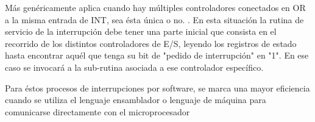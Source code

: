 \documentclass[12pt, letter]{article}
\begin{document}
\setlength{\parindent}{31pt}
Más genéricamente aplica cuando hay múltiples controladores conectados en OR a la misma entrada de INT, sea ésta única o no. \parencite{ArquitecturaCom}. En esta situación la rutina de servicio de la interrupción debe tener una parte inicial que consista en el recorrido de los distintos controladores de E/S, leyendo los registros de estado hasta encontrar aquél que tenga su bit de "pedido de interrupción" en "1". En ese caso se invocará a la sub-rutina asociada a ese controlador específico.

\setlength{\parindent}{31pt}
Para éstos procesos de interrupciones por software, se marca una mayor eficiencia cuando se utiliza el lenguaje ensamblador o lenguaje de máquina para comunicarse directamente con el microprocesador
\end{document}
